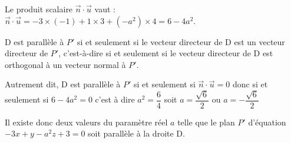 \documentclass[10pt]{article}
\providecommand{\vect}[1]{\overrightarrow{#1}}
\begin{document}
\begin{enumerate}
Le produit scalaire $\vect{n}\cdot\vect{u}$ vaut :\quad $\vect{n}\cdot\vect{u} = -3\times (-1) + 1 \times 3 + (-a^2 )\times 4 = 6-4a^2$.

D est parallèle à $P'$ si et seulement si le vecteur directeur de D est un vecteur directeur de $P'$, c'est-à-dire si et seulement si le vecteur directeur de D est orthogonal à un vecteur normal à $P'$.

Autrement dit, D est parallèle à $P'$ si et seulement si $\vect{n}\cdot\vect{u} = 0$ donc si et seulement si $ 6-4a^2 = 0$ c'est à dire $a^2=\dfrac{6}{4}$ soit $ a= \dfrac{\sqrt{6}}{2}$ ou $a=-\dfrac{\sqrt{6}}{2}$

Il  existe donc deux valeurs du paramètre réel $a$ telle que le plan $P'$ d'équation $-3 x+y-a^{2} z+3=0$ soit parallèle à la droite D.
		\end{enumerate}


\medskip
\end{document}
